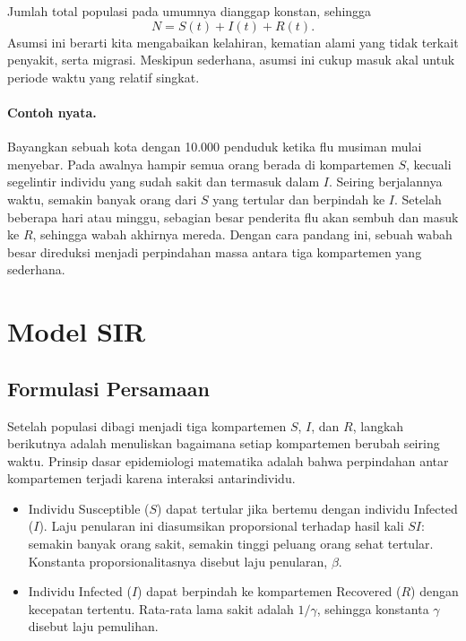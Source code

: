 \documentclass{bukumjh}
\begin{document}
Jumlah total populasi pada umumnya dianggap konstan, sehingga
\[
N = S(t) + I(t) + R(t).
\]
Asumsi ini berarti kita mengabaikan kelahiran, kematian alami yang tidak terkait penyakit, serta migrasi. Meskipun sederhana, asumsi ini cukup masuk akal untuk periode waktu yang relatif singkat.

\paragraph{Contoh nyata.}  
Bayangkan sebuah kota dengan 10.000 penduduk ketika flu musiman mulai menyebar. Pada awalnya hampir semua orang berada di kompartemen $S$, kecuali segelintir individu yang sudah sakit dan termasuk dalam $I$. Seiring berjalannya waktu, semakin banyak orang dari $S$ yang tertular dan berpindah ke $I$. Setelah beberapa hari atau minggu, sebagian besar penderita flu akan sembuh dan masuk ke $R$, sehingga wabah akhirnya mereda. Dengan cara pandang ini, sebuah wabah besar direduksi menjadi perpindahan massa antara tiga kompartemen yang sederhana.

\section{Model SIR}

\subsection{Formulasi Persamaan}

Setelah populasi dibagi menjadi tiga kompartemen $S$, $I$, dan $R$, langkah berikutnya adalah menuliskan bagaimana setiap kompartemen berubah seiring waktu. Prinsip dasar epidemiologi matematika adalah bahwa perpindahan antar kompartemen terjadi karena {\jsg interaksi} antarindividu.

\begin{itemize}
    \item Individu {\jsg Susceptible} ($S$) dapat tertular jika bertemu dengan individu {\jsg Infected} ($I$). Laju penularan ini diasumsikan proporsional terhadap hasil kali $SI$: semakin banyak orang sakit, semakin tinggi peluang orang sehat tertular. Konstanta proporsionalitasnya disebut {\jsg laju penularan}, $\beta$.
    \item Individu {\jsg Infected} ($I$) dapat berpindah ke kompartemen {\jsg Recovered} ($R$) dengan kecepatan tertentu. Rata-rata lama sakit adalah $1/\gamma$, sehingga konstanta $\gamma$ disebut {\jsg laju pemulihan}.
\end{itemize}
\end{document}
